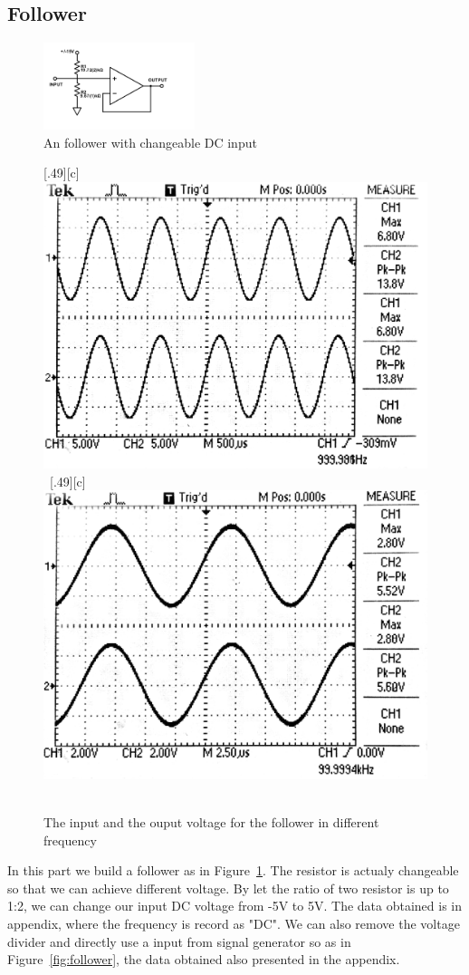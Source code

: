 \documentclass[aps,prl,reprint]{revtex4-1}
\begin{document}
    \subsection{Follower}
        \begin{figure}[h]
            \centering
            \includegraphics[height=1in]{image/follower/Amp-Follower-Lab.pdf}
            \caption{An follower with changeable DC input}
            \label{fig:followerLab}
        \end{figure}{}

        \begin{figure}[t]
            \centering
            [.49\linewidth][c]{%
                \includegraphics[width=.49\linewidth]{image/follower/1kHz.pdf}}\ 
            [.49\linewidth][c]{%
                \includegraphics[width=.49\linewidth]{image/follower/100kHz.pdf}}\ 
            \caption{The input and the ouput voltage for the follower in different frequency}
        \end{figure}
        In this part we build a follower as in Figure~\ref{fig:followerLab}. The resistor is actualy changeable so that we can achieve different voltage. By let the ratio of two resistor is up to 1:2, we can change our input DC voltage from -5V to 5V. The data obtained is in appendix, where the frequency is record as "DC". We can also remove the voltage divider and directly use a input from signal generator so as in Figure~\ref{fig:follower}, the data obtained also presented in the appendix.
\end{document}
